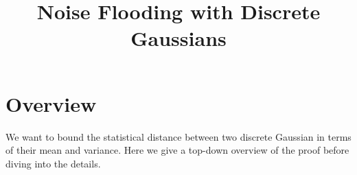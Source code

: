 \documentclass{article}
\title{Noise Flooding with Discrete Gaussians}
\begin{document}
\maketitle

\section{Overview}

We want to bound the statistical distance between two discrete Gaussian in terms of their mean and variance.
Here we give a top-down overview of the proof before diving into the details.
\end{document}
